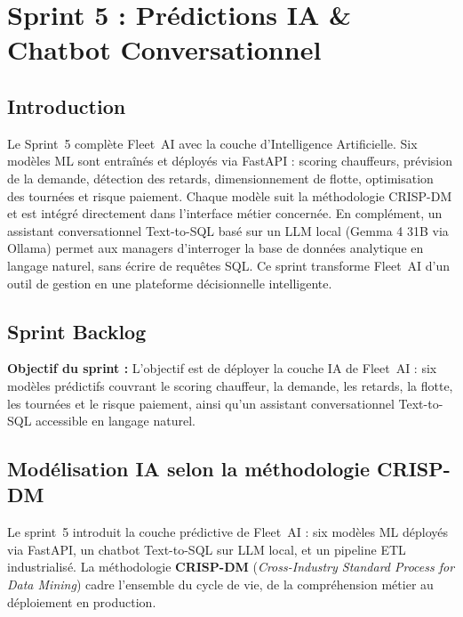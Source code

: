 ﻿\chapter{Sprint 5 : Prédictions IA \& Chatbot Conversationnel}

\section*{Introduction}
Le Sprint~5 complète Fleet~AI avec la couche d'Intelligence Artificielle. Six modèles ML sont entraînés et déployés via FastAPI : scoring chauffeurs, prévision de la demande, détection des retards, dimensionnement de flotte, optimisation des tournées et risque paiement. Chaque modèle suit la méthodologie CRISP-DM et est intégré directement dans l'interface métier concernée. En complément, un assistant conversationnel Text-to-SQL basé sur un LLM local (Gemma 4 31B via Ollama) permet aux managers d'interroger la base de données analytique en langage naturel, sans écrire de requêtes SQL. Ce sprint transforme Fleet~AI d'un outil de gestion en une plateforme décisionnelle intelligente.

\section{Sprint Backlog}

\textbf{Objectif du sprint :} L'objectif est de déployer la couche IA de Fleet~AI : six modèles prédictifs couvrant le scoring chauffeur, la demande, les retards, la flotte, les tournées et le risque paiement, ainsi qu'un assistant conversationnel Text-to-SQL accessible en langage naturel.



\section{Modélisation IA selon la méthodologie CRISP-DM}

Le sprint~5 introduit la couche prédictive de Fleet~AI : six modèles ML déployés via FastAPI, un chatbot Text-to-SQL sur LLM local, et un pipeline ETL industrialisé. La méthodologie \textbf{CRISP-DM} (\textit{Cross-Industry Standard Process for Data Mining}) cadre l'ensemble du cycle de vie, de la compréhension métier au déploiement en production.

